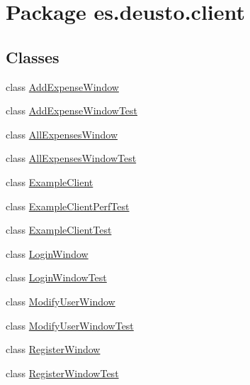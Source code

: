 \hypertarget{namespacees_1_1deusto_1_1client}{}\section{Package es.\+deusto.\+client}
\label{namespacees_1_1deusto_1_1client}
\subsection*{Classes}
\begin{DoxyCompactItemize}
\item 
class \hyperlink{classes_1_1deusto_1_1client_1_1_add_expense_window}{Add\+Expense\+Window}
\item 
class \hyperlink{classes_1_1deusto_1_1client_1_1_add_expense_window_test}{Add\+Expense\+Window\+Test}
\item 
class \hyperlink{classes_1_1deusto_1_1client_1_1_all_expenses_window}{All\+Expenses\+Window}
\item 
class \hyperlink{classes_1_1deusto_1_1client_1_1_all_expenses_window_test}{All\+Expenses\+Window\+Test}
\item 
class \hyperlink{classes_1_1deusto_1_1client_1_1_example_client}{Example\+Client}
\item 
class \hyperlink{classes_1_1deusto_1_1client_1_1_example_client_perf_test}{Example\+Client\+Perf\+Test}
\item 
class \hyperlink{classes_1_1deusto_1_1client_1_1_example_client_test}{Example\+Client\+Test}
\item 
class \hyperlink{classes_1_1deusto_1_1client_1_1_login_window}{Login\+Window}
\item 
class \hyperlink{classes_1_1deusto_1_1client_1_1_login_window_test}{Login\+Window\+Test}
\item 
class \hyperlink{classes_1_1deusto_1_1client_1_1_modify_user_window}{Modify\+User\+Window}
\item 
class \hyperlink{classes_1_1deusto_1_1client_1_1_modify_user_window_test}{Modify\+User\+Window\+Test}
\item 
class \hyperlink{classes_1_1deusto_1_1client_1_1_register_window}{Register\+Window}
\item 
class \hyperlink{classes_1_1deusto_1_1client_1_1_register_window_test}{Register\+Window\+Test}
\end{DoxyCompactItemize}
